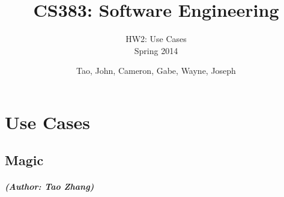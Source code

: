 \documentclass[12pt,letterpaper]{scrreprt}
\title{CS383: Software Engineering}
\subtitle{HW2: Use Cases\\Spring 2014}
\author{Tao, John, Cameron, Gabe, Wayne, Joseph} %
\date{}
\begin{document}
\maketitle
\tableofcontents %


\chapter{Use Cases}

\section{Magic}
\paragraph{(Author: Tao Zhang)}
\end{document}
